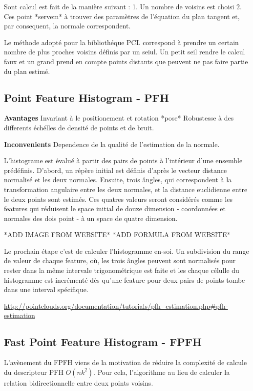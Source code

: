 Sont calcul est fait de la manière suivant :
1. Un nombre de voisins est choisi 
2. Ces point *servem* à trouver des paramètres de l'équation du plan tangent et, par consequent, la normale correspondent.

Le méthode adopté pour la bibliothéque PCL correspond à prendre un certain nombre de plus proches voisins définis par un seiul. Un petit seil rendre le calcul faux et un grand prend en compte points distants que peuvent ne pas faire partie du plan estimé.

\subsection{Point Feature Histogram - PFH}

\textbf{Avantages}
Invariant à le positionement et rotation *pose*
Robustesse à des differents échélles de densité de points et de bruit.

\textbf{Inconvenients}
Dependence de la qualité de l'estimation de la normale.


L'histograme est évalué à partir des pairs de points à l'intérieur d'une ensemble prédéfinis. D'abord, un répère initial est définis d'après le vecteur distance normalisé et les deux normales. Ensuite, trois ângles, qui correspondent à la transformation angulaire entre les deux normales, et la distance euclidienne entre le deux points sont estimés. Ces quatres valeurs seront considérés comme les features qui réduisent le space initial de douze dimension - coordonnées et normales des dois point - à un space de quatre dimension.

*ADD IMAGE FROM WEBSITE*
*ADD FORMULA FROM WEBSITE*


Le prochain étape c'est de calculer l'histogramme en-soi. Un subdivision du range de valeur de chaque feature, où, les trois ângles peuvent sont normalisés pour rester dans la même intervale trigonométrique est faite et les chaque célulle du histogramme est incrémenté dès qu'une feature pour deux pairs de points tombe dans une interval spécifique. 

\url{http://pointclouds.org/documentation/tutorials/pfh_estimation.php#pfh-estimation}

\subsection{Fast Point Feature Histogram - FPFH}

L'avènement du FPFH viens de la motivation de réduire la complexité de calcule du descripteur PFH $ O(nk^2) $. Pour cela, l'algorithme au lieu de calculer la relation bidirectionnelle entre deux points voisins.

